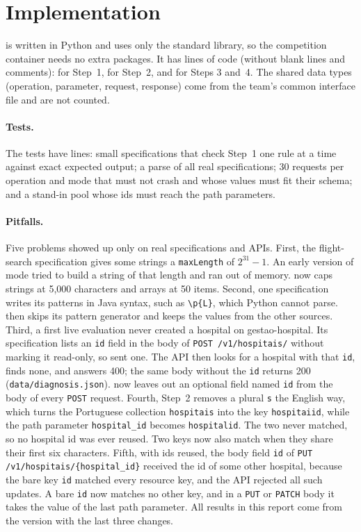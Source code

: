 \section{Implementation}
\label{sec:impl}

\tool is written in Python and uses only the standard library, so the
competition container needs no extra packages. It has \NLocSpec lines of
code (without blank lines and comments): \NLocParser for Step~1,
\NLocDeps for Step~2, and \NLocValues for Steps 3 and~4. The shared data
types (operation, parameter, request, response) come from the team's common
interface file and are not counted.

\paragraph{Tests.} The tests have \NLocTests lines: \NLevels small
specifications that check Step~1 one rule at a time against exact expected
output; a parse of all \NSpecs real specifications; 30 requests per
operation and mode that must not crash and whose  values must fit
their schema; and a stand-in pool whose ids must reach the path parameters.

\paragraph{Pitfalls.} Five problems showed up only on real specifications
and APIs.
First, the flight-search specification gives some strings a
\texttt{maxLength} of $2^{31}-1$. An early version of  mode
tried to build a string of that length and ran out of memory. \tool now caps
strings at 5{,}000 characters and arrays at 50 items. Second, one
specification writes its patterns in Java syntax, such as \verb|\p{L}|,
which Python cannot parse. \tool then skips its pattern generator and keeps
the values from the other sources. Third, a first live evaluation never
created a hospital on gestao-hospital. Its specification lists an
\texttt{id} field in the body of \texttt{POST /v1/hospitais/} without marking
it read-only, so \tool sent one. The API then looks for a hospital with that
\texttt{id}, finds none, and answers 400; the same body without the
\texttt{id} returns 200
(\texttt{data/diagnosis.json}). \tool now leaves out an optional field named
\texttt{id} from the body of every \texttt{POST} request. Fourth, Step~2
removes a plural \texttt{s} the English way, which turns the Portuguese
collection \texttt{hospitais} into the key \texttt{hospitaiid}, while the path
parameter \texttt{hospital\_id} becomes \texttt{hospitalid}. The two never
matched, so no hospital id was ever reused. Two keys now also match when they
share their first six characters. Fifth, with ids reused, the body field
\texttt{id} of \texttt{PUT /v1/hospitais/\{hospital\_id\}} received the id
of some other hospital, because the bare key \texttt{id} matched every
resource key, and the API rejected all such updates. A bare \texttt{id} now
matches no other key, and in a \texttt{PUT} or \texttt{PATCH} body it takes
the value of the last path parameter. All results in this report come from
the version with the last three changes.
